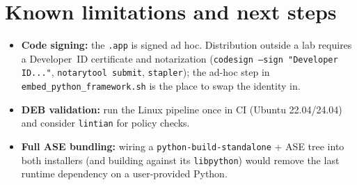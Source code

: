 \documentclass[11pt,a4paper]{article}
\newcommand{\file}[1]{\texttt{#1}}
\begin{document}
\section{Known limitations and next steps}

\begin{itemize}[itemsep=2pt]
  \item \textbf{Code signing:} the \file{.app} is signed ad hoc.
        Distribution outside a lab requires a Developer~ID certificate
        and notarization (\file{codesign --sign "Developer ID..."},
        \file{notarytool submit}, \file{stapler}); the ad-hoc step in
        \file{embed\_python\_framework.sh} is the place to swap the
        identity in.
  \item \textbf{DEB validation:} run the Linux pipeline once in CI
        (Ubuntu 22.04/24.04) and consider \file{lintian} for policy
        checks.
  \item \textbf{Full ASE bundling:} wiring a
        \texttt{python-build-standalone} + ASE tree into both installers
        (and building against its \file{libpython}) would remove the
        last runtime dependency on a user-provided Python.
\end{itemize}
\end{document}
